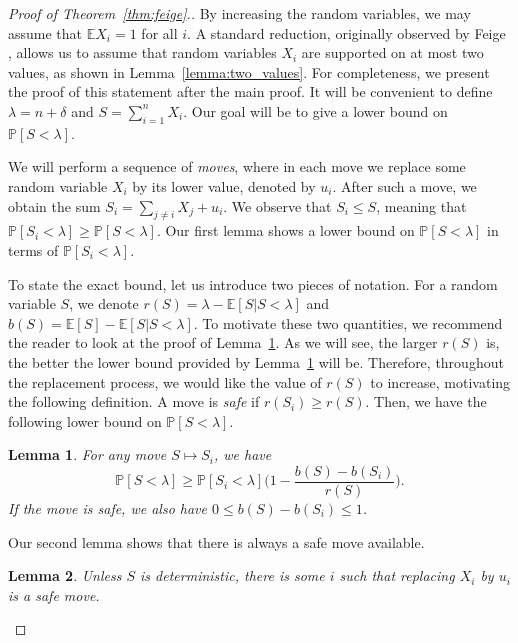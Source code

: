 \documentclass[10pt]{article}
\newtheorem{lemma}{Lemma}
\newcommand{\bE}{\mathbb{E}}
\newcommand{\Pb}{\mathbb P}
\begin{document}
\begin{proof}[Proof of Theorem~\ref{thm:feige}.]
By increasing the random variables, we may assume that $\bE X_i=1$ for all $i$.
A standard reduction, originally observed by Feige \cite{F06}, allows us to assume that random variables $X_i$ are supported on at most two values, as shown in Lemma~\ref{lemma:two_values}. For completeness, we present the proof of this statement after the main proof. It will be convenient to define $\lambda=n+\delta$ and $S=\sum_{i=1}^n X_i$. Our goal will be to give a lower bound on $\Pb[S<\lambda]$.

We will perform a sequence of \textit{moves}, where in each move we replace some random variable $X_i$ by its lower value, denoted by $u_i$. After such a move, we obtain the sum $S_i=\sum_{j\neq i} X_j + u_i$. We observe that $S_i\leq S$, meaning that $\Pb[S_i<\lambda]\geq \Pb[S<\lambda]$. Our first lemma shows a lower bound on $\Pb[S<\lambda]$ in terms of $\Pb[S_i<\lambda]$. 

To state the exact bound, let us introduce two pieces of notation. For a random variable $S$, we denote $r(S)=\lambda-\bE[S|S<\lambda]$ and $b(S)=\bE[S]-\bE[S|S<\lambda]$. To motivate these two quantities, we recommend the reader to look at the proof of Lemma~\ref{lemma:lower_bound}. As we will see, the larger $r(S)$ is, the better the lower bound provided by Lemma~\ref{lemma:lower_bound} will be. Therefore, throughout the replacement process, we would like the value of $r(S)$ to increase, motivating the following definition. A move is \textit{safe} if $r(S_i)\geq r(S)$. Then, we have the following lower bound on $\Pb[S<\lambda]$.

\begin{lemma}\label{lemma:lower_bound}
For any move $S\mapsto S_i$, we have
\vspace{-0.1cm}
\begin{equation}\label{eq:lower_bound}
\Pb[S<\lambda]\ge \Pb[S_i<\lambda]\Big(1-\frac{b(S)-b(S_i)}{r(S)}\Big).
\end{equation}
If the move is safe, we also have $0\leq b(S)-b(S_i)\leq 1$.
\end{lemma}

Our second lemma shows that there is always a safe move available.

\begin{lemma}\label{lemma:safe_move}
Unless $S$ is deterministic, there is some $i$ such that replacing $X_i$ by $u_i$ is a safe move.
\end{lemma}
 

\end{proof}
\end{document}
